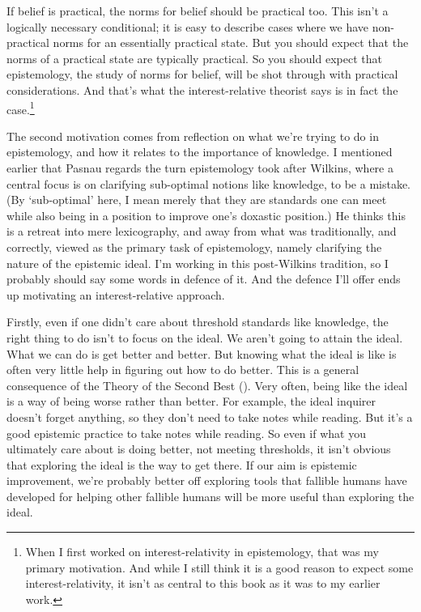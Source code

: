 \documentclass[
  12pt,
  letterpaper,
]{scrbook}
\begin{document}
If belief is practical, the norms for belief should be practical too.
This isn't a logically necessary conditional; it is easy to describe
cases where we have non-practical norms for an essentially practical
state. But you should expect that the norms of a practical state are
typically practical. So you should expect that epistemology, the study
of norms for belief, will be shot through with practical considerations.
And that's what the interest-relative theorist says is in fact the
case.\footnote{When I first worked on interest-relativity in
  epistemology, that was my primary motivation. And while I still think
  it is a good reason to expect some interest-relativity, it isn't as
  central to this book as it was to my earlier work.}

The second motivation comes from reflection on what we're trying to do
in epistemology, and how it relates to the importance of knowledge. I
mentioned earlier that Pasnau regards the turn epistemology took after
Wilkins, where a central focus is on clarifying sub-optimal notions like
knowledge, to be a mistake. (By `sub-optimal' here, I mean merely that
they are standards one can meet while also being in a position to
improve one's doxastic position.) He thinks this is a retreat into mere
lexicography, and away from what was traditionally, and correctly,
viewed as the primary task of epistemology, namely clarifying the nature
of the epistemic ideal. I'm working in this post-Wilkins tradition, so I
probably should say some words in defence of it. And the defence I'll
offer ends up motivating an interest-relative approach.

Firstly, even if one didn't care about threshold standards like
knowledge, the right thing to do isn't to focus on the ideal. We aren't
going to attain the ideal. What we can do is get better and better. But
knowing what the ideal is like is often very little help in figuring out
how to do better. This is a general consequence of the Theory of the
Second Best (). Very often, being like the ideal is a way of being worse
rather than better. For example, the ideal inquirer doesn't forget
anything, so they don't need to take notes while reading. But it's a
good epistemic practice to take notes while reading. So even if what you
ultimately care about is doing better, not meeting thresholds, it isn't
obvious that exploring the ideal is the way to get there. If our aim is
epistemic improvement, we're probably better off exploring tools that
fallible humans have developed for helping other fallible humans will be
more useful than exploring the ideal.
\end{document}
